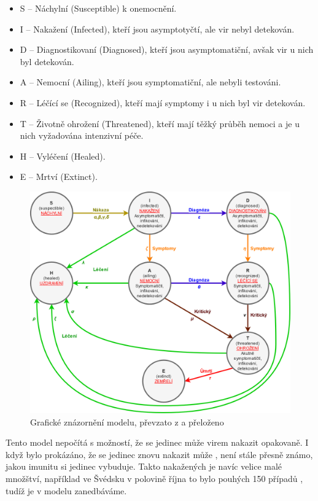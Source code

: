 \documentclass[a4paper,11pt]{article}
\begin{document}
		\begin{itemize}
			\item S -- Náchylní (Susceptible) k onemocnění.
			\item I -- Nakažení (Infected), kteří jsou asymptotyčtí, ale vir nebyl detekován.
			\item D -- Diagnostikovaní (Diagnosed), kteří jsou asymptomatiční, avšak vir u nich byl detekován.
			\item A -- Nemocní (Ailing), kteří jsou symptomatiční, ale nebyli testováni.
			\item R -- Léčící se (Recognized), kteří mají symptomy i u nich byl vir detekován.
			\item T -- Životně ohrožení (Threatened), kteří mají těžký průběh nemoci a je u nich vyžadována intenzivní péče.
			\item H -- Vyléčení (Healed).
			\item E -- Mrtví (Extinct).
		\end{itemize}
	
		\begin{figure}[H]
			\caption{Grafické znázornění modelu, převzato z \cite{source} a přeloženo}
			\label{fig1}
			\centering
			\includegraphics[scale=0.25]{model.png}
		\end{figure}
	
		Tento model nepočítá s možností, že se jedinec může virem nakazit opakovaně. I když bylo prokázáno, že se jedinec znovu nakazit může \cite{reinfection}, není stále přesně známo, jakou imunitu si jedinec vybuduje. Takto nakažených je navíc velice malé množštví, například ve Švédsku v polovině října to bylo pouhých 150 případů \cite{reincases}, tudíž je v modelu zanedbáváme.
		
\end{document}
